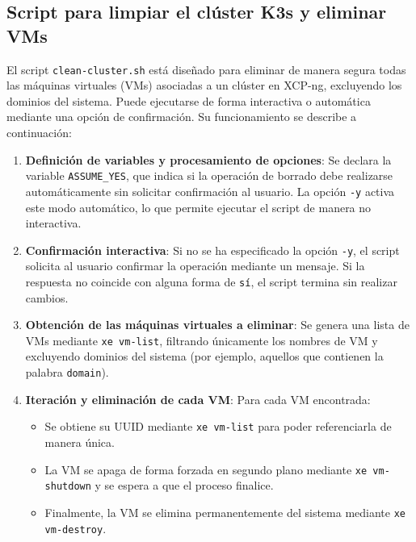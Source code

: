 \subsection{Script para limpiar el clúster K3s y eliminar VMs}
\noindent
El script \texttt{clean-cluster.sh} está diseñado para eliminar de manera segura todas las máquinas virtuales (VMs) asociadas a un clúster en XCP-ng, excluyendo los dominios del sistema. Puede ejecutarse de forma interactiva o automática mediante una opción de confirmación. Su funcionamiento se describe a continuación:

\begin{enumerate}
    \item \textbf{Definición de variables y procesamiento de opciones}:  
    Se declara la variable \texttt{ASSUME\_YES}, que indica si la operación de borrado debe realizarse automáticamente sin solicitar confirmación al usuario.  
    La opción \texttt{-y} activa este modo automático, lo que permite ejecutar el script de manera no interactiva.

    \item \textbf{Confirmación interactiva}:  
    Si no se ha especificado la opción \texttt{-y}, el script solicita al usuario confirmar la operación mediante un mensaje. Si la respuesta no coincide con alguna forma de \texttt{sí}, el script termina sin realizar cambios.

    \item \textbf{Obtención de las máquinas virtuales a eliminar}:  
    Se genera una lista de VMs mediante \texttt{xe vm-list}, filtrando únicamente los nombres de VM y excluyendo dominios del sistema (por ejemplo, aquellos que contienen la palabra \texttt{domain}).  

    \item \textbf{Iteración y eliminación de cada VM}:  
    Para cada VM encontrada:
    \begin{itemize}
        \item Se obtiene su UUID mediante \texttt{xe vm-list} para poder referenciarla de manera única.
        \item La VM se apaga de forma forzada en segundo plano mediante \texttt{xe vm-shutdown} y se espera a que el proceso finalice.
        \item Finalmente, la VM se elimina permanentemente del sistema mediante \texttt{xe vm-destroy}.
    \end{itemize}
\end{enumerate}

